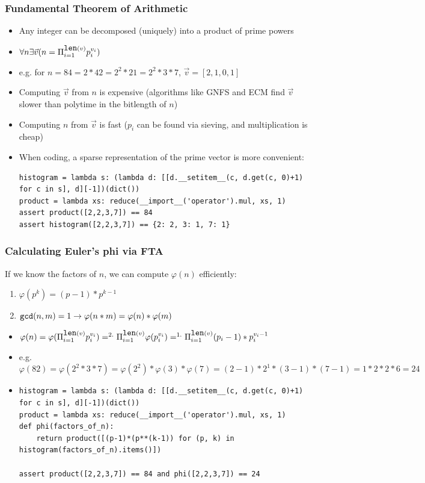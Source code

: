 \documentclass[aspectratio=169]{beamer}
\begin{document}
\begin{frame}[fragile]
\frametitle{Fundamental Theorem of Arithmetic}
\begin{itemize}
\item Any integer can be decomposed (uniquely) into a product of prime powers
\item $\forall n \exists \vec{v} (n = \Pi_{i=1}^{\verb|len|(v)}p_i^{v_i})$
\item e.g. for $n = 84 = 2*42 = 2^2*21 = 2^2 * 3 * 7$, $\vec{v} = [2, 1, 0, 1]$
\item Computing $\vec{v}$ from $n$ is expensive (algorithms like GNFS and ECM find $\vec{v}$ slower than polytime in the bitlength of $n$)
\item Computing $n$ from $\vec{v}$ is fast ($p_i$ can be found via sieving, and multiplication is cheap)
\item When coding, a sparse representation of the prime vector is more convenient:
\begin{Verbatim}[fontsize=\tiny]
histogram = lambda s: (lambda d: [[d.__setitem__(c, d.get(c, 0)+1) for c in s], d][-1])(dict())
product = lambda xs: reduce(__import__('operator').mul, xs, 1)
assert product([2,2,3,7]) == 84
assert histogram([2,2,3,7]) == {2: 2, 3: 1, 7: 1}
\end{Verbatim}
\end{itemize}
\end{frame}

\begin{frame}[fragile]
\frametitle{Calculating Euler's phi via FTA}
If we know the factors of $n$, we can compute $\varphi(n)$ efficiently:
\begin{enumerate}[1.]
\item $\varphi(p^k) = (p - 1)*p^{k-1}$
\item $\verb|gcd|(n, m) = 1 \rightarrow \varphi(n*m) = \varphi(n)*\varphi(m)$
\end{enumerate}
\begin{itemize}
\item {\small $\varphi(n) =
\varphi(\Pi_{i=1}^{\verb|len|(v)}p_i^{v_i}) =^{2.}
\Pi_{i=1}^{\verb|len|(v)}\varphi(p_i^{v_i}) =^{1.}
\Pi_{i=1}^{\verb|len|(v)}(p_i-1)*p_i^{v_i-1}$ }
\item e.g. $\varphi(82) = \varphi(2^2*3*7) = \varphi(2^2)*\varphi(3)*\varphi(7) = (2-1)*2^1*(3-1)*(7-1) = 1*2*2*6 = 24$
\item \begin{Verbatim}[fontsize=\tiny]
histogram = lambda s: (lambda d: [[d.__setitem__(c, d.get(c, 0)+1) for c in s], d][-1])(dict())
product = lambda xs: reduce(__import__('operator').mul, xs, 1)
def phi(factors_of_n):
    return product([(p-1)*(p**(k-1)) for (p, k) in histogram(factors_of_n).items()])

assert product([2,2,3,7]) == 84 and phi([2,2,3,7]) == 24
\end{Verbatim}
\end{itemize}
\end{frame}
\end{document}

